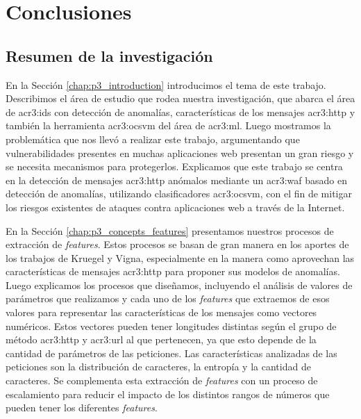 \section{Conclusiones}
\label{chap:p3_conclusions}

\subsection{Resumen de la investigación}

En la Sección \ref{chap:p3_introduction} introducimos el tema de este trabajo.
Describimos el área de estudio que rodea nuestra investigación, que abarca
el área de \gls{acr3:ids} con detección de anomalías, características
de los mensajes \gls{acr3:http} y también la herramienta \gls{acr3:ocsvm}
del área de \gls{acr3:ml}. Luego mostramos la problemática que nos llevó
a realizar este trabajo, argumentando que vulnerabilidades presentes en
muchas aplicaciones web presentan un gran riesgo y se necesita mecanismos
para protegerlos.
Explicamos que este trabajo se centra en la detección de mensajes
\gls{acr3:http} anómalos mediante un \gls{acr3:waf} basado en detección
de anomalías, utilizando clasificadores \gls{acr3:ocsvm}, con el fin de
mitigar los riesgos existentes de ataques contra aplicaciones web a
través de la Internet.

En la Sección \ref{chap:p3_concepts_features} presentamos nuestros procesos
de extracción de \textit{features}. Estos procesos se basan de gran manera
en los aportes de los trabajos de Kruegel y Vigna, especialmente en la
manera como aprovechan las características de mensajes \gls{acr3:http}
para proponer sus modelos de anomalías. Luego explicamos los procesos que
diseñamos, incluyendo el análisis de valores de parámetros que realizamos
y cada uno de los \textit{features} que extraemos de esos valores para
representar las características de los mensajes como vectores numéricos.
Estos vectores pueden tener longitudes distintas según el grupo de método
\gls{acr3:http} y \gls{acr3:url} al que pertenecen, ya que esto depende
de la cantidad de parámetros de las peticiones.
Las características analizadas de las peticiones son la distribución de
caracteres, la entropía y la cantidad de caracteres. Se complementa esta
extracción de \textit{features} con un proceso de escalamiento para reducir
el impacto de los distintos rangos de números que pueden tener los diferentes
\textit{features}.

